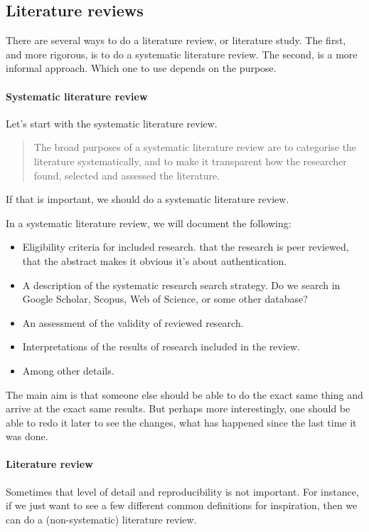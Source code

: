 \subsection{Literature reviews}

There are several ways to do a literature review, or literature study.
The first, and more rigorous, is to do a systematic literature review.
The second, is a more informal approach.
Which one to use depends on the purpose.

\paragraph{Systematic literature review}

Let's start with the systematic literature review.
\blockcquote{ANUSLR}{%
The broad purposes of a systematic literature review are to categorise the 
literature systematically, and to make it transparent how the researcher found, 
selected and assessed the literature.%
}
If that is important, we should do a systematic literature review.

In a systematic literature review, we will document the 
following\autocite{ElsevierSLR}:
\begin{itemize}
  \item Eligibility criteria for included research.
    \Eg that the research is peer reviewed, that the abstract makes it 
    obvious it's about authentication.
  \item A description of the systematic research search strategy.
    Do we search in Google Scholar, Scopus, Web of Science, or some other 
    database?
  \item An assessment of the validity of reviewed research.
  \item Interpretations of the results of research included in the review.
  \item Among other details.
\end{itemize}
The main aim is that someone else should be able to do the exact same thing and 
arrive at the exact same results.
But perhaps more interestingly, one should be able to redo it later to see the 
changes, what has happened since the last time it was done.

\paragraph{Literature review}

Sometimes that level of detail and reproducibility is not important.
For instance, if we just want to see a few different common definitions for 
inspiration, then we can do a (non-systematic) literature review.

